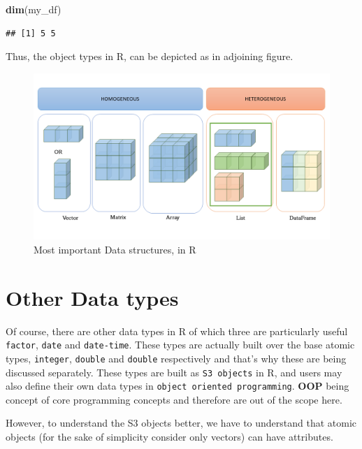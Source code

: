 \documentclass[
]{book}
\newenvironment{Shaded}{\begin{snugshade}}{\end{snugshade}}
\newcommand{\FunctionTok}[1]{\textcolor[rgb]{0.13,0.29,0.53}{\textbf{#1}}}
\newcommand{\NormalTok}[1]{#1}
\begin{document}
\begin{Shaded}
\begin{Highlighting}[]
\FunctionTok{dim}\NormalTok{(my\_df)}
\end{Highlighting}
\end{Shaded}

\begin{verbatim}
## [1] 5 5
\end{verbatim}

Thus, the object types in R, can be depicted as in adjoining figure.

\begin{figure}

{\centering \includegraphics[width=0.99\linewidth]{images/Objects} 

}

\caption{Most important Data structures, in R}\label{fig:impdstr}
\end{figure}

\hypertarget{other-data-types}{%
\section{Other Data types}\label{other-data-types}}

Of course, there are other data types in R of which three are particularly useful \texttt{factor}, \texttt{date} and \texttt{date-time}. These types are actually built over the base atomic types, \texttt{integer}, \texttt{double} and \texttt{double} respectively and that's why these are being discussed separately. These types are built as \texttt{S3\ objects} in R, and users may also define their own data types in \texttt{object\ oriented\ programming}. \textbf{OOP} being concept of core programming concepts and therefore are out of the scope here.

However, to understand the S3 objects better, we have to understand that atomic objects (for the sake of simplicity consider only vectors) can have attributes.
\end{document}
